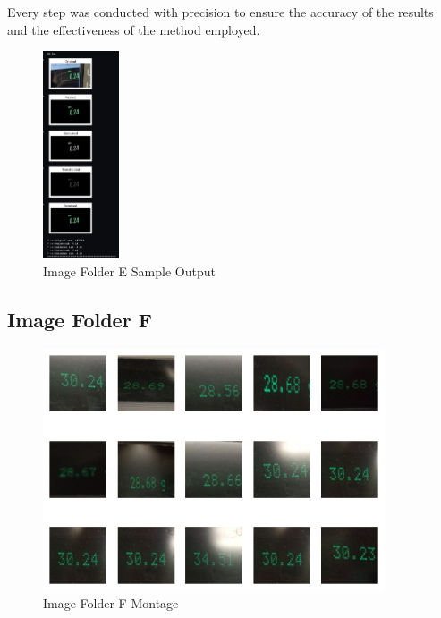 Every step was conducted with precision to ensure the accuracy of the results and the effectiveness of the method employed.

\begin{figure}[ht]
    \centering
    \includegraphics[width=0.2\textwidth]{Figures/Methodology/sipa_07/sample_output.jpg}
    \caption[Image Folder E Sample Output]{Image Folder E Sample Output}
    \label{fig:Image Folder E Sample Output}
\end{figure}


\newpage

\subsection{Image Folder F}

\begin{figure}[ht]
    \centering
    \includegraphics[width=0.9\textwidth]{Figures/EDA_Charts/8/montage.png}
    \caption[Image Folder F Montage]{Image Folder F Montage}
    \label{fig:Image Folder F Montage}
\end{figure}

